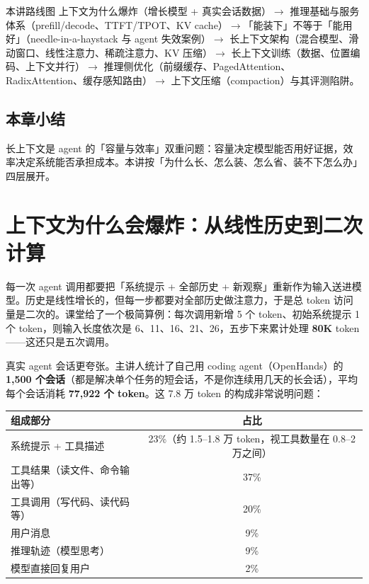 \documentclass[a4paper]{article}
\begin{document}
\begin{knowledgebox}{本讲路线图}
上下文为什么爆炸（增长模型 + 真实会话数据）$\rightarrow$ 推理基础与服务体系（prefill/decode、TTFT/TPOT、KV cache）$\rightarrow$「能装下」不等于「能用好」（needle-in-a-haystack 与 agent 失效案例）$\rightarrow$ 长上下文架构（混合模型、滑动窗口、线性注意力、稀疏注意力、KV 压缩）$\rightarrow$ 长上下文训练（数据、位置编码、上下文并行）$\rightarrow$ 推理侧优化（前缀缓存、PagedAttention、RadixAttention、缓存感知路由）$\rightarrow$ 上下文压缩（compaction）与其评测陷阱。
\end{knowledgebox}

\subsection{本章小结}
长上下文是 agent 的「容量与效率」双重问题：容量决定模型能否用好证据，效率决定系统能否承担成本。本讲按「为什么长、怎么装、怎么省、装不下怎么办」四层展开。

\section{上下文为什么会爆炸：从线性历史到二次计算}

每一次 agent 调用都要把「系统提示 + 全部历史 + 新观察」重新作为输入送进模型。历史是线性增长的，但每一步都要对全部历史做注意力，于是总 token 访问量是二次的。课堂给了一个极简算例：每次调用新增 5 个 token、初始系统提示 1 个 token，则输入长度依次是 6、11、16、21、26，五步下来累计处理 \textbf{80K} token——这还只是五次调用。

真实 agent 会话更夸张。主讲人统计了自己用 coding agent（OpenHands）的 \textbf{1,500 个会话}（都是解决单个任务的短会话，不是你连续用几天的长会话），平均每个会话消耗 \textbf{77,922 个 token}。这 7.8 万 token 的构成非常说明问题：

\begin{center}
\begin{tabular}{lc}
\toprule
组成部分 & 占比 \\
\midrule
系统提示 + 工具描述 & 23\%（约 1.5--1.8 万 token，视工具数量在 0.8--2 万之间） \\
工具结果（读文件、命令输出等） & 37\% \\
工具调用（写代码、读代码等） & 20\% \\
用户消息 & 9\% \\
推理轨迹（模型思考） & 9\% \\
模型直接回复用户 & 2\% \\
\bottomrule
\end{tabular}
\end{center}
\end{document}
